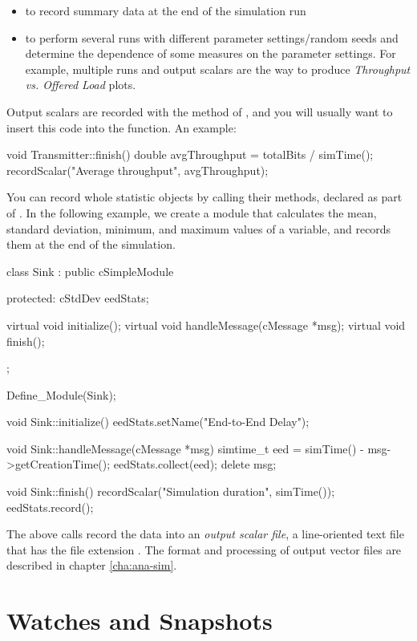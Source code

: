 \begin{itemize}
\item to record summary data at the end of the simulation run
\item to perform several runs with different parameter settings/random seeds
    and determine the dependence of some measures on the parameter
    settings. For example, multiple runs and output scalars are the
    way to produce \textit{Throughput vs. Offered Load} plots.
\end{itemize}

Output scalars are recorded with the  method of
, and you will usually want to insert this code
into the  function. An example:

\begin{cpp}
void Transmitter::finish()
{
    double avgThroughput = totalBits / simTime();
    recordScalar("Average throughput", avgThroughput);
}
\end{cpp}

You can record whole statistic objects by calling their 
methods, declared as part of . In the following example,
we create a  module that calculates the mean, standard
deviation, minimum, and maximum values of a variable, and records them at the
end of the simulation.

\begin{cpp}
class Sink : public cSimpleModule
{
  protected:
    cStdDev eedStats;

    virtual void initialize();
    virtual void handleMessage(cMessage *msg);
    virtual void finish();
};

Define_Module(Sink);

void Sink::initialize()
{
    eedStats.setName("End-to-End Delay");
}

void Sink::handleMessage(cMessage *msg)
{
    simtime_t eed = simTime() - msg->getCreationTime();
    eedStats.collect(eed);
    delete msg;
}

void Sink::finish()
{
    recordScalar("Simulation duration", simTime());
    eedStats.record();
}
\end{cpp}

The above calls record the data into an \textit{output scalar file},
a line-oriented text file that has the file extension .
The format and processing of output vector files are described in chapter
\ref{cha:ana-sim}.



\section{Watches and Snapshots}
\label{sec:sim-lib:watches-and-snapshots}

